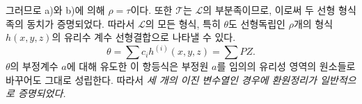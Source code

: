 
그러므로 a)와 b)에 의해 $\rho=\tau$이다. 또한 $\mathcal T$는 $\mathcal L$의 부분족이므로, 이로써 두 선형 형식족의 동치가 증명되었다. 따라서 $\mathcal L$의 모든 형식, 특히 $\theta$도 선형독립인 $\rho$개의 형식 $h(x,y,z)$의 유리수 계수 선형결합으로 나타낼 수 있다.
\[
  \theta=\sum c_i h^{(i)}(x,y,z)=\sum PZ.
\]
$\theta$의 부정계수 $a$에 대해 유도한 이 항등식은 부정원 $a$를 임의의 유리성 영역의 원소들로 바꾸어도 그대로 성립한다. 따라서 \emph{세 개의 이진 변수열인 경우에 환원정리가 일반적으로 증명되었다.}
